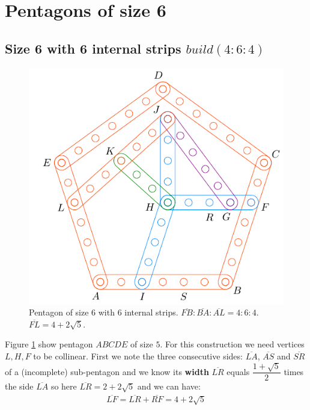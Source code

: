 \documentclass[11pt]{article}
\begin{document}

\section{Pentagons of size 6}

\subsection{Size 6 with 6 internal strips $build(4:6:4)$}

\begin{figure}[H]
\centering
\includegraphics[scale=1]{6/penta6-6a}
\caption{Pentagon of size 6 with 6 internal strips. $\overline{FB} : \overline{BA} : \overline{AL} = 4:6:4$. $\overline{FL} = 4 + 2\sqrt5$.}
\label{fig:penta6-6a}
\end{figure}

Figure \ref{fig:penta6-6a} show pentagon $ABCDE$ of size $5$. For this construction we need vertices $L,H,F$ to be collinear. First we note the three consecutive sides: $\overline{LA}$, $\overline{AS}$ and $\overline{SR}$ of a (incomplete) sub-pentagon and we know its \textbf{width} $\overline{LR}$ equals $\dfrac{1+\sqrt5}2$ times the side $\overline{LA}$ so here $\overline{LR} = 2 + 2\sqrt5$ and we can have:
\begin{align}
\overline{LF} = \overline{LR} + \overline{RF} = 4 + 2\sqrt5
\end{align}
\end{document}
